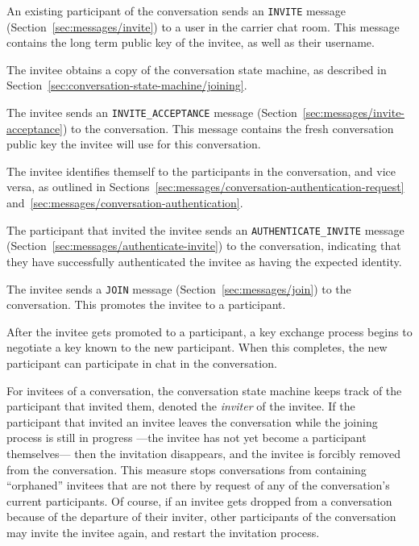 \documentclass{article}
\def\message#1{\texttt{#1}}
\begin{document}
\begin{description}[noitemsep]
\item[Step 1.] An existing participant of the conversation sends an \message{INVITE} message (Section~\ref{sec:messages/invite}) to a user in the carrier chat room. This message contains the long term public key of the invitee, as well as their username.
\item[Step 2.] The invitee obtains a copy of the conversation state machine, as described in Section~\ref{sec:conversation-state-machine/joining}.
\item[Step 3.] The invitee sends an \message{INVITE\_ACCEPTANCE} message (Section~\ref{sec:messages/invite-acceptance}) to the conversation. This message contains the fresh conversation public key the invitee will use for this conversation.
\item[Step 4.] The invitee identifies themself to the participants in the conversation, and vice versa, as outlined in Sections~\ref{sec:messages/conversation-authentication-request} and~\ref{sec:messages/conversation-authentication}.
\item[Step 5.] The participant that invited the invitee sends an \message{AUTHENTICATE\_INVITE} message (Section~\ref{sec:messages/authenticate-invite}) to the conversation, indicating that they have successfully authenticated the invitee as having the expected identity.
\item[Step 6.] The invitee sends a \message{JOIN} message (Section~\ref{sec:messages/join}) to the conversation. This promotes the invitee to a participant.
\item[Aftermath.] After the invitee gets promoted to a participant, a key exchange process begins to negotiate a key known to the new participant. When this completes, the new participant can participate in chat in the conversation.
\end{description}

For invitees of a conversation, the conversation state machine keeps track of the participant that invited them, denoted the \emph{inviter} of the invitee.
If the participant that invited an invitee leaves the conversation while the joining process is still in progress ---the invitee has not yet become a participant themselves--- then the invitation disappears, and the invitee is forcibly removed from the conversation.
This measure stops conversations from containing ``orphaned'' invitees that are not there by request of any of the conversation's current participants.
Of course, if an invitee gets dropped from a conversation because of the departure of their inviter, other participants of the conversation may invite the invitee again, and restart the invitation process.
\end{document}
